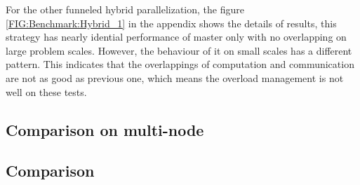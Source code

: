 For the other funneled hybrid parallelization, the figure 
            \ref{FIG:Benchmark:Hybrid_1} 
in the appendix shows the details of results,
this strategy has nearly idential performance of master only with no overlapping on large problem scales.
However, the behaviour of it on small scales has a different pattern.
This indicates that the overlappings of computation and communication are not as good as previous one, which means the overload management is not 
well on these tests.




\subsection{Comparison on multi-node}
\subsection{Comparison}





